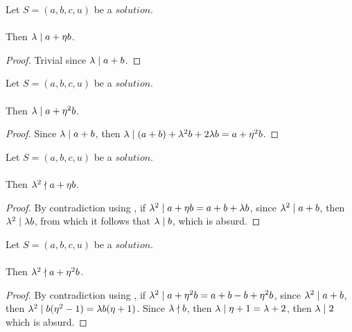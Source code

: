 \begin{lemma}
    \label{lmm:lambda_dvd_a_add_eta_mul_b}
    \leanok
    Let $S=(a, b, c, u)$ be a $solution$.\\\\
    Then $\lambda \mid a + \eta  b$.
\end{lemma}
\begin{proof}
    \leanok
    Trivial since $\lambda \mid a+b$.
\end{proof}

\begin{lemma}
    \label{lmm:lambda_dvd_a_add_eta_sq_mul_b}
    \leanok
    Let $S=(a, b, c, u)$ be a $solution$.\\\\
    Then $\lambda \mid a + \eta^2  b$.
\end{lemma}
\begin{proof}
    \leanok
    Since $\lambda \mid a+b$, then
    $\lambda \mid (a + b) + \lambda^2  b + 2  \lambda  b
    = a + \eta^2  b$.
\end{proof}

\begin{lemma}
    \label{lmm:lambda_sq_not_dvd_a_add_eta_mul_b}
    \leanok
    Let $S=(a, b, c, u)$ be a $solution$.\\\\
    Then $\lambda^2 \nmid a + \eta  b$.
\end{lemma}
\begin{proof}
    \leanok
    By contradiction using , if $\lambda^2 \mid a +\eta b = a + b + \lambda  b$,
    since $\lambda^2 \mid a+b$, then $\lambda^2 \mid \lambda  b$, from which it follows
    that $\lambda \mid b$, which is absurd.
\end{proof}

\begin{lemma}
    \label{lmm:lambda_sq_not_dvd_a_add_eta_sq_mul_b}
    \leanok
    Let $S=(a, b, c, u)$ be a $solution$.\\\\
    Then $\lambda^2 \nmid a + \eta^2  b$.
\end{lemma}
\begin{proof}
    \leanok
    By contradiction using ,
    if $\lambda^2 \mid a +\eta^2 b = a + b -b + \eta^2  b$,
    since $\lambda^2 \mid a+b$, then $\lambda^2 \mid b  (\eta^2 -1)
    = \lambda  b  (\eta + 1)$. Since $\lambda \nmid b$, then
    $\lambda \mid \eta+1 = \lambda +2$, then $\lambda \mid 2$ which is absurd.
\end{proof}

